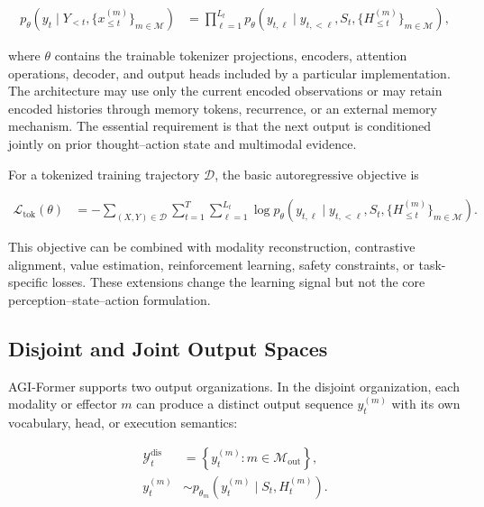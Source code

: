 \begin{equation}
\begin{aligned}
    p_{\theta}\!\left(y_t
    \mid Y_{<t},\{x_{\leq t}^{(m)}\}_{m\in\mathcal{M}}\right)
    &= \prod_{\ell=1}^{L_t}
       p_{\theta}\!\left(
       y_{t,\ell}
       \mid y_{t,<\ell},S_t,
       \{H_{\leq t}^{(m)}\}_{m\in\mathcal{M}}
       \right),
\end{aligned}
\label{eq:conditional_generation}
\end{equation}

where $\theta$ contains the trainable tokenizer projections, encoders, attention operations, decoder, and output heads included by a particular implementation. The architecture may use only the current encoded observations or may retain encoded histories through memory tokens, recurrence, or an external memory mechanism. The essential requirement is that the next output is conditioned jointly on prior thought--action state and multimodal evidence.

For a tokenized training trajectory $\mathcal{D}$, the basic autoregressive objective is

\begin{equation}
\begin{aligned}
    \mathcal{L}_{\mathrm{tok}}(\theta)
    &= -\sum_{(X,Y)\in\mathcal{D}}
       \sum_{t=1}^{T}
       \sum_{\ell=1}^{L_t}
       \log p_{\theta}\!\left(
       y_{t,\ell}
       \mid y_{t,<\ell},S_t,
       \{H_{\leq t}^{(m)}\}_{m\in\mathcal{M}}
       \right).
\end{aligned}
\label{eq:token_objective}
\end{equation}

This objective can be combined with modality reconstruction, contrastive alignment, value estimation, reinforcement learning, safety constraints, or task-specific losses. These extensions change the learning signal but not the core perception--state--action formulation.

\subsection{\textbf{Disjoint and Joint Output Spaces}}

AGI-Former supports two output organizations. In the disjoint organization, each modality or effector $m$ can produce a distinct output sequence $y_t^{(m)}$ with its own vocabulary, head, or execution semantics:

\begin{equation}
\begin{aligned}
    \mathcal{Y}^{\mathrm{dis}}_t
    &= \left\{y_t^{(m)}:m\in\mathcal{M}_{\mathrm{out}}\right\},\\
    y_t^{(m)}
    &\sim p_{\theta_m}\!\left(
       y_t^{(m)}\mid S_t,H_t^{(m)}
       \right).
\end{aligned}
\label{eq:disjoint_outputs}
\end{equation}

